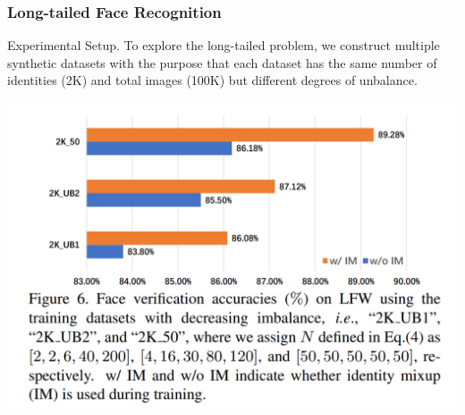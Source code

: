 \documentclass[12pt]{article}
\begin{document}
\subsubsection{Long-tailed Face Recognition}
Experimental Setup. To explore the long-tailed problem, we construct multiple synthetic datasets with the purpose that each dataset has the same number of identities
(2K) and total images (100K) but different degrees of unbalance. 
\begin{center}
  \includegraphics[scale = 1]{img6.png}
\end{center}
\end{document}
